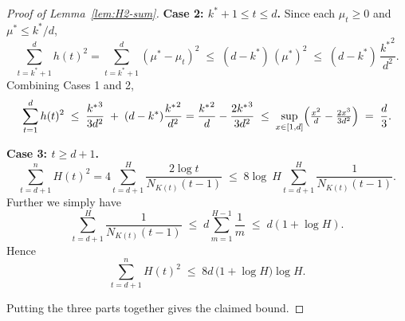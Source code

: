 \documentclass[12pt,draftcls, onecolumn]{IEEEtran}
\begin{document}
{\begin{proof}[Proof of Lemma~\ref{lem:H2-sum}]
\noindent\textbf{Case 2: \(k^*+1\le t\le {d}\).}  Since each \(\mu_t\ge0\) and \(\mu^*\le k^*/{d}\),
\[
\sum_{t=k^*+1}^{{d}}h(t)^2
=\sum_{t=k^*+1}^{{d}}(\mu^*-\mu_t)^2
\;\le\;
({d}-k^*)\,(\mu^*)^2
\;\le\;
({d}-k^*)\,\frac{{k^*}^2}{{d}^2}.
\]
Combining Cases 1 and 2,
\[
\sum_{t=1}^{{d}}h(t)^2
\;\le\;
\frac{{k^*}^3}{3{d}^2}
\;+\;
({d}-k^*)\frac{{k^*}^2}{{d}^2}
=
\frac{{k^*}^2}{{d}}
-\frac{2{k^*}^3}{3{d}^2}
\;\le\;
\sup_{x\in[1,{d}]}\Bigl(\tfrac{x^2}{{d}}-\tfrac{2x^3}{3{d}^2}\Bigr)
\;=\;
\frac{{d}}{3}.
\]

\noindent\textbf{Case 3: \(t\ge{d}+1\).}  
\[
\sum_{t={d}+1}^nH(t)^2
=4\sum_{t={d}+1}^H\frac{2\log t}{N_{K(t)}(t-1)}
\;\le\;
8\log\ H
\sum_{t={d}+1}^H\frac{1}{N_{K(t)}(t-1)}.
\]
Further we simply have
\[
\sum_{t={d}+1}^H\frac{1}{N_{K(t)}(t-1)}
\;\le\;
{d}\sum_{m=1}^{H-1} \frac{1}{m}
\;\le\;
{d}\left(1 + \log H\right).
\]
Hence
\[
\sum_{t={d}+1}^nH(t)^2
\;\le\;
8{d}\,\bigl(1 + \log H\bigr)\log H.
\]

Putting the three parts together gives the claimed bound.
\end{proof}



}
\end{document}
